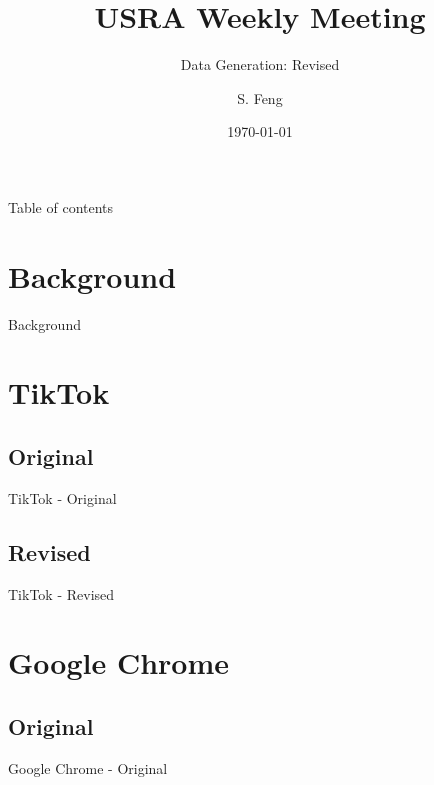 \documentclass{beamer}
\title[USRA Weekly Meeting]{
  USRA Weekly Meeting
}
\subtitle[]{Data Generation: Revised}
\author[Shuo Feng]{S. Feng}
\institute[NIMS Lab]{
  NIMS Lab\\
  USRA Summer 2023}
\date{\today}
\begin{document}
\frame{\titlepage}


\begin{frame}{Table of contents}
  \tableofcontents
\end{frame}


\section{Background}
\begin{frame}{Background}
\end{frame}


\section{TikTok}

\subsection{Original}
\begin{frame}{TikTok - Original}
\end{frame}

\subsection{Revised}
\begin{frame}{TikTok - Revised}
\end{frame}


\section{Google Chrome}

\subsection{Original}
\begin{frame}{Google Chrome - Original}
\end{frame}
\end{document}
